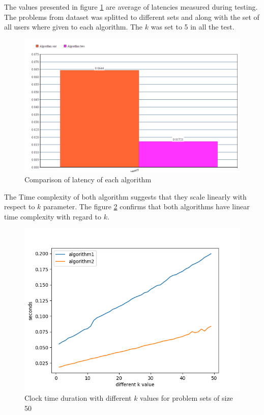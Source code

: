 \documentclass{template}
\begin{document}
The values presented in figure \ref{fig:latency_eval} are average of latencies measured during testing.
The problems from dataset was splitted to different sets and along with the set of all users where 
given to each algorithm. The \(k\) was set to 5 in all the test.

\begin{figure}
    \includegraphics[width=\linewidth]{./images/latency_eval.png}
    \caption{Comparison of latency of each algorithm}
    \label{fig:latency_eval}
\end{figure}

The Time complexity of both algorithm suggests that they scale linearly with respect to \(k\) parameter.
The figure \ref{fig:k-comparison} confirms that both algorithms have linear time complexity with regard
to \(k\).

\begin{figure}
    \includegraphics[width=\linewidth]{./images/algo1_algo2_diff_k.png}
    \caption{Clock time duration with different \(k\) values for problem sets of size 50}
    \label{fig:k-comparison}
\end{figure} 
\end{document}
